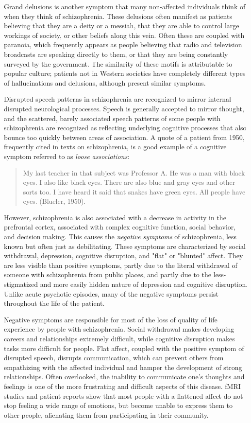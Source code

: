\documentclass[12pt,twoside]{reedthesis}
\begin{document}
	Grand delusions is another symptom that many non-affected individuals think of when they think of schizophrenia. These delusions often manifest as patients believing that they are a deity or a messiah, that they are able to control large workings of society, or other beliefs along this vein. Often these are coupled with paranoia, which frequently appears as people believing that radio and television broadcasts are speaking directly to them, or that they are being constantly surveyed by the government. The similarity of these motifs is attributable to popular culture; patients not in Western societies have completely different types of hallucinations and delusions, although present similar symptoms. 
	
	Disrupted speech patterns in schizophrenia are recognized to mirror internal disrupted neurological processes. Speech is generally accepted to mirror thought, and the scattered, barely associated speech patterns of some people with schizophrenia are recognized as reflecting underlying cognitive processes that also bounce too quickly between areas of association. A quote of a patient from 1950, frequently cited in texts on schizophrenia, is a good example of a cognitive symptom referred to as \textit{loose associations}: \begin{quote}My last teacher in that subject was Professor A. He was a man with black eyes. I also like black eyes. There are also blue and gray eyes and other sorts too. I have heard it said that snakes have green eyes. All people have eyes. (Blueler, 1950).\end{quote}
	
	 However, schizophrenia is also associated with a decrease in activity in the prefrontal cortex, associated with complex cognitive function, social behavior, and decision making. This causes the \textit{negative symptoms} of schizophrenia, less known but often just as debilitating. These symptoms are characterized by social withdrawal, depression, cognitive disruption, and "flat" or "blunted" affect. They are less visible than positive symptoms, partly due to the literal withdrawal of someone with schizophrenia from public places, and partly due to the less-stigmatized and more easily hidden nature of depression and cognitive disruption. Unlike acute psychotic episodes, many of the negative symptoms persist throughout the life of the patient. 
	
	Negative symptoms are responsible for most of the loss of quality of life experience by people with schizophrenia. Social withdrawal makes developing careers and relationships extremely difficult, while cognitive disruption makes tasks more difficult for people. Flat affect, coupled with the positive symptom of disrupted speech, disrupts communication, which can prevent others from empathizing with the affected individual and hamper the development of strong relationships. Often overlooked, the inability to communicate one's thoughts and feelings is one of the more frustrating and difficult aspects of this disease. fMRI studies and patient reports show that most people with a flattened affect do not stop feeling a wide range of emotions, but become unable to express them to other people, alienating them from participating in their community.
	
\end{document}
